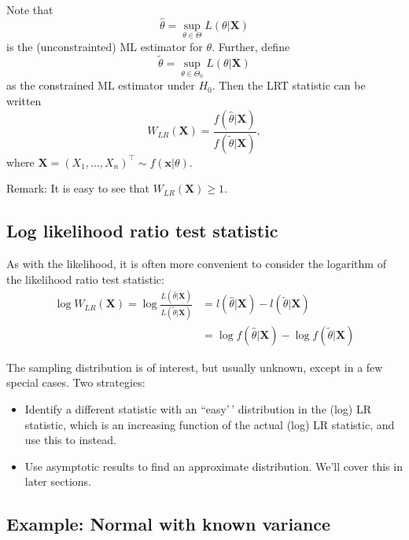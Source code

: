 \documentclass[
]{book}
\providecommand{\tightlist}{%
  \setlength{\itemsep}{0pt}\setlength{\parskip}{0pt}}
\newcommand{\bx}{{\boldsymbol x}}
\newcommand{\bX}{{\boldsymbol X}}
\theoremstyle{definition}
\theoremstyle{definition}
\theoremstyle{definition}
\theoremstyle{definition}
\theoremstyle{remark}
\begin{document}
Note that
\[
\hat \theta = \sup_{\theta\in\Theta} L(\theta|\bX)
\]
is the (unconstrainted) ML estimator for \(\theta\).
Further, define
\[
\tilde \theta = \sup_{\theta\in\Theta_0} L(\theta|\bX)
\]
as the constrained ML estimator under \(H_0\). Then the LRT statistic can be written
\[
W_{LR}(\bX) = \frac{f(\hat\theta|\bX)}{f(\tilde\theta|\bX)},
\]
where \(\bX = (X_1,\dots,X_n)^\top \sim f(\bx|\theta)\).

Remark: It is easy to see that \(W_{LR}(\bX) \geq 1\).

\hypertarget{log-likelihood-ratio-test-statistic}{%
\subsection{Log likelihood ratio test statistic}\label{log-likelihood-ratio-test-statistic}}

As with the likelihood, it is often more convenient to consider the logarithm of the likelihood ratio test statistic:
\begin{align*}
\log W_{LR}(\bX) 
= \log \frac{L(\hat\theta|\bX)}{L(\tilde\theta|\bX)} 
&= l(\hat\theta|\bX) - l(\tilde \theta|\bX)\\ 
&= \log  f(\hat\theta|\bX) - \log f(\tilde\theta|\bX)
\end{align*}

The sampling distribution is of interest, but usually unknown, except in a few special cases. Two strategies:

\begin{itemize}
\tightlist
\item
  Identify a different statistic with an ``easy'\,' distribution in the (log) LR statistic, which is an increasing function of the actual (log) LR statistic, and use this to instead.
\item
  Use asymptotic results to find an approximate distribution. We'll cover this in later sections.
\end{itemize}

\hypertarget{example-normal-with-known-variance}{%
\subsection{Example: Normal with known variance}\label{example-normal-with-known-variance}}
\end{document}
